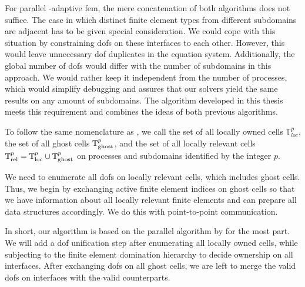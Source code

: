 For parallel \hp-adaptive \gls{fem}, the mere concatenation of both algorithms does not suffice. The case in which distinct finite element types from different subdomains are adjacent has to be given special consideration. We could cope with this situation by constraining \glspl{dof} on these interfaces to each other. However, this would leave unnecessary \gls{dof} duplicates in the equation system. Additionally, the global number of \glspl{dof} would differ with the number of subdomains in this approach. We would rather keep it independent from the number of processes, which would simplify debugging and assures that our solvers yield the same results on any amount of subdomains. The algorithm developed in this thesis meets this requirement and combines the ideas of both previous algorithms.

To follow the same nomenclature as \cite{bangerth2012}, we call the set of all locally owned cells $\mathbb{T}^p_{loc}$, the set of all ghost cells $\mathbb{T}^p_{\text{ghost}}$, and the set of all locally relevant cells $\mathbb{T}^p_{\text{rel}} = \mathbb{T}^p_{\text{loc}} \cup \mathbb{T}^p_{\text{ghost}}$ on processes and subdomains identified by the integer $p$.

We need to enumerate all \glspl{dof} on locally relevant cells, which includes ghost cells. Thus, we begin by exchanging active finite element indices on ghost cells so that we have information about all locally relevant finite elements and can prepare all data structures accordingly. We do this with point-to-point communication.

In short, our algorithm is based on the parallel algorithm by \textcite{bangerth2012} for the most part. We will add a \gls{dof} unification step after enumerating all locally owned cells, while subjecting to the finite element domination hierarchy to decide ownership on all interfaces. After exchanging \glspl{dof} on all ghost cells, we are left to merge the valid \glspl{dof} on interfaces with the valid counterparts.

